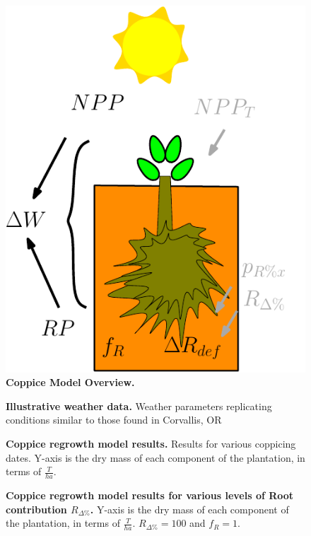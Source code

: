 \documentclass[10pt]{article}
\newcommand{\NPPdef}{\ensuremath{NPP_{def}}}
\newcommand{\NPPt}{\ensuremath{NPP_{T}}}
\newcommand{\NPP}{\ensuremath{NPP}}
\newcommand{\RP}{\ensuremath{RP}}
\newcommand{\Rdp}{\ensuremath{R_{\Delta\%}}}
\newcommand{\WR}{\ensuremath{W_R}}
\newcommand{\W}{\ensuremath{W}}
\newcommand{\dRres}{\ensuremath{\Delta R_{res}}}
\newcommand{\dW}{\ensuremath{\Delta W}}
\newcommand{\fR}{\ensuremath{f_R}}
\newcommand{\pRx}{\ensuremath{p_{R\%x}}}
\begin{document}
\begin{figure}%
\ifdefined\SHOWFIGS
   \centering
   \includegraphics[width=0.3\linewidth]{img/tree_pics_10}
\fi
\caption{ {\bf Coppice Model Overview.} }
\label{fig:coppice}
\end{figure}

\begin{figure}%
\ifdefined\SHOWFIGS
  \centering
  
\fi
  \caption{ {\bf Illustrative weather data.} Weather parameters replicating
    conditions similar to those found in Corvallis, OR}
  \label{fig:weather}
\end{figure}

\begin{figure}%
\ifdefined\SHOWFIGS
  \centering
  
\fi
  \caption{{\bf Coppice regrowth model results.}  Results for various coppicing
    dates.  Y-axis is the dry mass of each component of the plantation, in terms
    of $\frac{T}{ha}$.}
  \label{fig:date}
\end{figure}

\begin{figure}%
\ifdefined\SHOWFIGS
  \centering
  
\fi
  \caption{ { \bf Coppice regrowth model results for various levels of Root
      contribution \Rdp.}  Y-axis is the dry mass of each component of the
    plantation, in terms of $\frac{T}{ha}$. $\Rdp=100$ and $\fR=1$.}
  \label{fig:rdp}
\end{figure}
\end{document}
